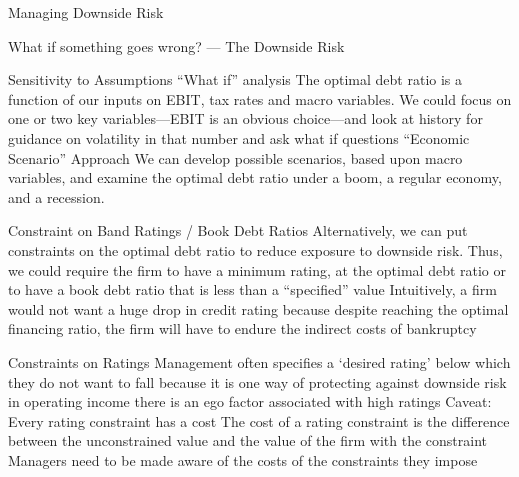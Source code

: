\documentclass[10pt]{article}
\begin{document}
    \begin{core}{Managing Downside Risk}

      What if something goes wrong? — The Downside Risk

      Sensitivity to Assumptions
      “What if” analysis
              The optimal debt ratio is a function of our inputs on EBIT, tax rates and macro variables. We could focus on one or two key variables—EBIT is an obvious choice—and look at history for guidance on volatility in that number and ask what if questions
      “Economic Scenario” Approach
              We can develop possible scenarios, based upon macro variables, and examine the optimal debt ratio under a boom, a regular economy, and a recession.

      Constraint on Band Ratings / Book Debt Ratios
      Alternatively, we can put constraints on the optimal debt ratio to reduce exposure to downside risk. Thus, we could require the firm to have a minimum rating, at the optimal debt ratio or to have a book debt ratio that is less than a “specified” value
      Intuitively, a firm would not want a huge drop in credit rating because despite reaching the optimal financing ratio, the firm will have to endure the indirect costs of bankruptcy

      Constraints on Ratings
      Management often specifies a ‘desired rating’ below which they do not want to fall because
      it is one way of protecting against downside risk in operating income
      there is an ego factor associated with high ratings
      Caveat: Every rating constraint has a cost
      The cost of a rating constraint is the difference between the unconstrained value and the value of the firm with the constraint
      Managers need to be made aware of the costs of the constraints they impose

    \end{core}
\end{document}
